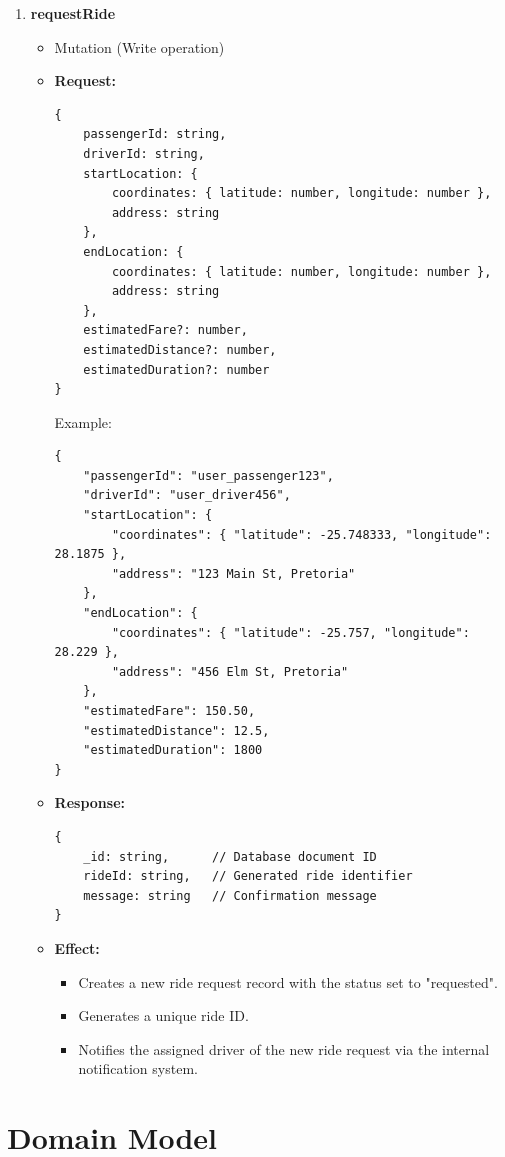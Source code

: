 \documentclass[a4paper,12pt]{article}
\begin{document}
\begin{enumerate}
    \item \textbf{requestRide}
    \begin{itemize}
        \item Mutation (Write operation)
        \item \textbf{Request:}
        \begin{verbatim}
{
    passengerId: string,
    driverId: string,
    startLocation: {
        coordinates: { latitude: number, longitude: number },
        address: string
    },
    endLocation: {
        coordinates: { latitude: number, longitude: number },
        address: string
    },
    estimatedFare?: number,
    estimatedDistance?: number,
    estimatedDuration?: number
}
        \end{verbatim}
        Example:
        \begin{verbatim}
{
    "passengerId": "user_passenger123",
    "driverId": "user_driver456",
    "startLocation": {
        "coordinates": { "latitude": -25.748333, "longitude": 28.1875 },
        "address": "123 Main St, Pretoria"
    },
    "endLocation": {
        "coordinates": { "latitude": -25.757, "longitude": 28.229 },
        "address": "456 Elm St, Pretoria"
    },
    "estimatedFare": 150.50,
    "estimatedDistance": 12.5,
    "estimatedDuration": 1800
}
        \end{verbatim}
        \item \textbf{Response:}
        \begin{verbatim}
{
    _id: string,      // Database document ID
    rideId: string,   // Generated ride identifier
    message: string   // Confirmation message
}
        \end{verbatim}
        \item \textbf{Effect:}
        \begin{itemize}
            \item Creates a new ride request record with the status set to "requested".
            \item Generates a unique ride ID.
            \item Notifies the assigned driver of the new ride request via the internal notification system.
        \end{itemize}
    \end{itemize}
     
\end{enumerate}

\section{Domain Model}
\end{document}
